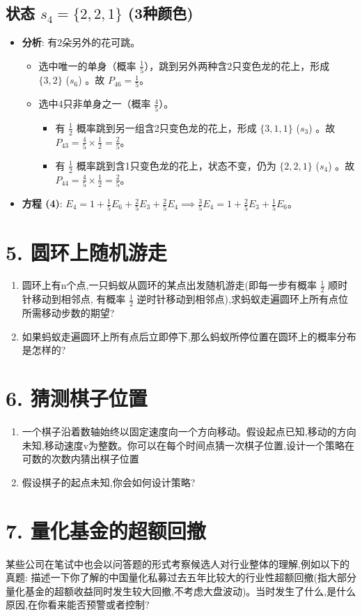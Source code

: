 \documentclass[UTF8]{ctexart}
\begin{document}
\subsection*{状态 $s_4 = \{2, 2, 1\}$ (3种颜色)}
\begin{itemize}
    \item \textbf{分析}: 有2朵另外的花可跳。
        \begin{itemize}
            \item 选中唯一的单身（概率 $\frac{1}{5}$），跳到另外两种含2只变色龙的花上，形成 $\{3,2\}$ ($s_6$) 。故 $P_{46} = \frac{1}{5}$。
            \item 选中4只非单身之一（概率 $\frac{4}{5}$）。
                \begin{itemize}
                    \item 有 $\frac{1}{2}$ 概率跳到另一组含2只变色龙的花上，形成 $\{3,1,1\}$ ($s_3$) 。故 $P_{43} = \frac{4}{5} \times \frac{1}{2} = \frac{2}{5}$。
                    \item 有 $\frac{1}{2}$ 概率跳到含1只变色龙的花上，状态不变，仍为 $\{2,2,1\}$ ($s_4$) 。故 $P_{44} = \frac{4}{5} \times \frac{1}{2} = \frac{2}{5}$。
                \end{itemize}
        \end{itemize}
    \item \textbf{方程 (4)}: $E_4 = 1 + \frac{1}{5}E_6 + \frac{2}{5}E_3 + \frac{2}{5}E_4 \implies \frac{3}{5}E_4 = 1 + \frac{2}{5}E_3 + \frac{1}{5}E_6$。
\end{itemize}


\section*{5. 圆环上随机游走}

\begin{enumerate}
    \item 圆环上有n个点,一只蚂蚁从圆环的某点出发随机游走(即每一步有概率 $\frac{1}{2}$ 顺时针移动到相邻点, 有概率 $\frac{1}{2}$ 逆时针移动到相邻点),求蚂蚁走遍圆环上所有点位所需移动步数的期望?
    \item 如果蚂蚁走遍圆环上所有点后立即停下,那么蚂蚁所停位置在圆环上的概率分布是怎样的?
\end{enumerate}

\section*{6. 猜测棋子位置}

\begin{enumerate}
    \item 一个棋子沿着数轴始终以固定速度向一个方向移动。假设起点已知,移动的方向未知,移动速度v为整数。你可以在每个时间点猜一次棋子位置,设计一个策略在可数的次数内猜出棋子位置
    \item 假设棋子的起点未知,你会如何设计策略?
\end{enumerate}

\section*{7. 量化基金的超额回撤}

某些公司在笔试中也会以问答题的形式考察候选人对行业整体的理解,例如以下的真题:
描述一下你了解的中国量化私募过去五年比较大的行业性超额回撤(指大部分量化基金的超额收益同时发生较大回撤,不考虑大盘波动)。当时发生了什么,是什么原因,在你看来能否预警或者控制?
\end{document}
